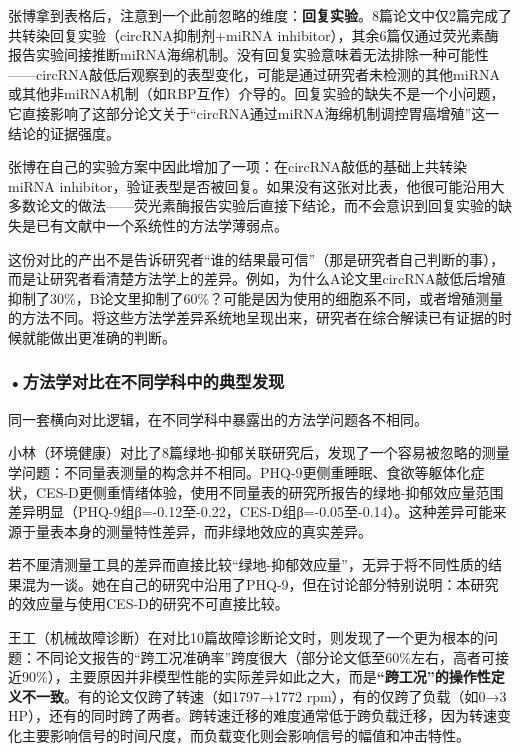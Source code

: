 \begin{critiquebox}
张博拿到表格后，注意到一个此前忽略的维度：\textbf{回复实验}。8篇论文中仅2篇完成了共转染回复实验（circRNA抑制剂+miRNA inhibitor），其余6篇仅通过荧光素酶报告实验间接推断miRNA海绵机制。没有回复实验意味着无法排除一种可能性——circRNA敲低后观察到的表型变化，可能是通过研究者未检测的其他miRNA或其他非miRNA机制（如RBP互作）介导的。回复实验的缺失不是一个小问题，它直接影响了这部分论文关于``circRNA通过miRNA海绵机制调控胃癌增殖''这一结论的证据强度。

张博在自己的实验方案中因此增加了一项：在circRNA敲低的基础上共转染miRNA inhibitor，验证表型是否被回复。如果没有这张对比表，他很可能沿用大多数论文的做法——荧光素酶报告实验后直接下结论，而不会意识到回复实验的缺失是已有文献中一个系统性的方法学薄弱点。
\end{critiquebox}

这份对比的产出不是告诉研究者``谁的结果最可信''（那是研究者自己判断的事），而是让研究者看清楚方法学上的差异。例如，为什么A论文里circRNA敲低后增殖抑制了30\%，B论文里抑制了60\%？可能是因为使用的细胞系不同，或者增殖测量的方法不同。将这些方法学差异系统地呈现出来，研究者在综合解读已有证据的时候就能做出更准确的判断。

\smallskip
\subsubsection*{\textbf{•方法学对比在不同学科中的典型发现}}同一套横向对比逻辑，在不同学科中暴露出的方法学问题各不相同。

小林（环境健康）对比了8篇绿地-抑郁关联研究后，发现了一个容易被忽略的测量学问题：不同量表测量的构念并不相同。PHQ-9更侧重睡眠、食欲等躯体化症状，CES-D更侧重情绪体验，使用不同量表的研究所报告的绿地-抑郁效应量范围差异明显（PHQ-9组β=-0.12至-0.22，CES-D组β=-0.05至-0.14）。这种差异可能来源于量表本身的测量特性差异，而非绿地效应的真实差异。

若不厘清测量工具的差异而直接比较``绿地-抑郁效应量''，无异于将不同性质的结果混为一谈。她在自己的研究中沿用了PHQ-9，但在讨论部分特别说明：本研究的效应量与使用CES-D的研究不可直接比较。

王工（机械故障诊断）在对比10篇故障诊断论文时，则发现了一个更为根本的问题：不同论文报告的``跨工况准确率''跨度很大（部分论文低至60\%左右，高者可接近90\%），主要原因并非模型性能的实际差异如此之大，而是\textbf{``跨工况''的操作性定义不一致}。有的论文仅跨了转速（如1797→1772 rpm），有的仅跨了负载（如0→3 HP），还有的同时跨了两者。跨转速迁移的难度通常低于跨负载迁移，因为转速变化主要影响信号的时间尺度，而负载变化则会影响信号的幅值和冲击特性。

